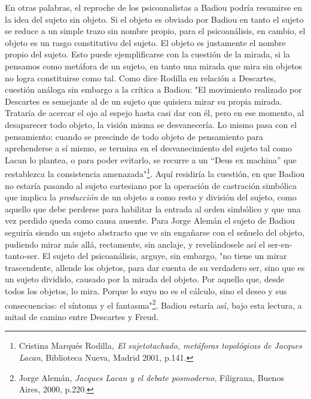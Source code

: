 En otras palabras, el reproche de los psicoanalistas a Badiou podría
resumirse en la idea del sujeto sin objeto. Si el objeto es obviado por
Badiou en tanto el sujeto se reduce a un simple trazo sin nombre propio,
para el psicoanálisis, en cambio, el objeto es un rasgo constitutivo del
sujeto. El objeto es justamente el nombre propio del sujeto. Esto puede
ejemplificarse con la cuestión de la mirada, si la pensamos como
metáfora de un sujeto, en tanto una mirada que mira sin objetos no logra
constituirse como tal. Como dice Rodilla en relación a Descartes,
cuestión análoga sin embargo a la crítica a Badiou: "El movimiento
realizado por Descartes es semejante al de un sujeto que quisiera mirar
su propia mirada. Trataría de acercar el ojo al espejo hasta casi dar
con él, pero en ese momento, al desaparecer todo objeto, la visión misma
se desvanecería. Lo mismo pasa con el pensamiento: cuando se prescinde
de todo objeto de pensamiento para aprehenderse a sí mismo, se termina
en el desvanecimiento del sujeto tal como Lacan lo plantea, o para poder
evitarlo, se recurre a un ``Deus ex machina'' que restablezca la
consistencia amenazada"\footnote{Cristina Marqués Rodilla\emph{, El
  sujetotachado, metáforas topológicas de Jacques Lacan}, Biblioteca
  Nueva, Madrid 2001, p.141.}. Aquí residiría la cuestión, en que Badiou
no estaría pasando al sujeto cartesiano por la operación de castración
simbólica que implica la \emph{producción} de un objeto \emph{a} como
resto y división del sujeto, como aquello que debe perderse para
habilitar la entrada al orden simbólico y que una vez perdido queda como
causa ausente. Para Jorge Alemán el sujeto de Badiou seguiría siendo un
sujeto abstracto que ve sin engañarse con el señuelo del objeto,
pudiendo mirar más allá, rectamente, sin anclaje, y revelándosele así el
ser-en-tanto-ser. El sujeto del psicoanálisis, arguye, sin embargo, "no
tiene un mirar trascendente, allende los objetos, para dar cuenta de su
verdadero ser, sino que es un sujeto dividido, causado por la mirada del
objeto. Por aquello que, desde todos los objetos, lo mira. Porque lo
suyo no es el cálculo, sino el deseo y sus consecuencias: el síntoma y
el fantasma"\footnote{Jorge Alemán, \emph{Jacques Lacan y el debate
  posmoderno}, Filigrana, Buenos Aires, 2000, p.220.}. Badiou estaría
así, bajo esta lectura, a mitad de camino entre Descartes y Freud.

